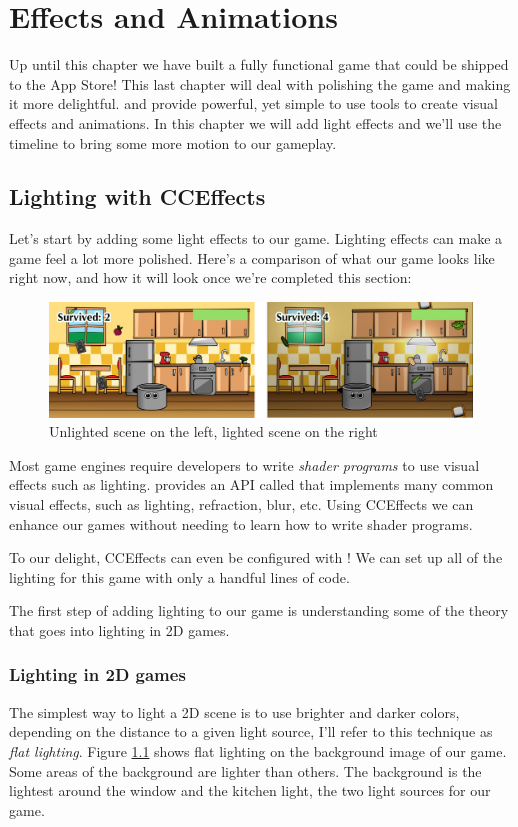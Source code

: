 \chapter{Effects and Animations}

Up until this chapter we have built a fully functional game that could be
shipped to the App Store! This last chapter will deal with polishing the game and making
it more delightful. \SB{} and \cocos{} provide powerful, yet simple to use tools
to create visual effects and animations. In this chapter we will add light
effects and we'll use the \SB{} timeline to bring some more motion to our
gameplay.

\section{Lighting with CCEffects}
Let's start by adding some light effects to our game. Lighting effects can make
a game feel a lot more polished. Here's a comparison of what our game looks like
right now, and how it will look once we're completed this section:

\begin{figure}[H]
    \centering
    \includegraphics[width=0.9\linewidth]{images/Chapter9/lighting_comparison.png}
    \caption{Unlighted scene on the left, lighted scene on the right}
    \label{lighting_example}
\end{figure}

Most game engines require developers to write \textit{shader programs} to
use visual effects such as lighting. \cocos{} provides an API called
 that implements many common visual effects, such as
lighting, refraction, blur, etc. Using CCEffects we can enhance our games
without needing to learn how to write shader programs. 

To our delight, CCEffects can even be configured with \SB{}! We can set up all
of the lighting for this game with only a handful lines of code. 

The first step of adding lighting to our game is understanding some of the
theory that goes into lighting in 2D games.

\subsection{Lighting in 2D games}
The simplest way to light a 2D scene is to use brighter and darker colors,
depending on the distance to a given light source, I'll refer to this technique
as \textit{flat lighting}. Figure \ref{lighting_example} shows flat lighting on
the background image of our game. Some areas of the background are lighter than
others. The background is the lightest around the window and the kitchen light,
the two light sources for our game.

